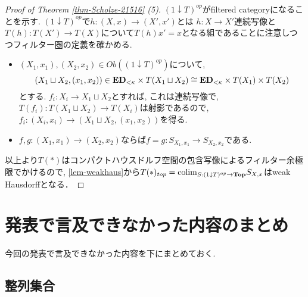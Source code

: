 \documentclass[dvipdfmx,a4paper,11pt]{report}
\newcommand{\colim}{{\rm colim}}
\theoremstyle{definition}
\begin{document}
\begin{proof}[Proof of Theorem \ref{thm-Scholze-21516} (5)]
 $ ( 1\downarrow T)^{op}$がfiltered categoryになることを示す. 
  $ ( 1\downarrow T)^{op}$で$h : (X,x) \to (X',x') $とは $h : X \to X'$連続写像と$T(h): T(X') \to T(X)$について$T(h)x' =x$となる組であることに注意しつつフィルター圏の定義を確かめる. 
 \begin{itemize}
\item $(X_1, x_1), (X_2,x_2) \in Ob(( 1\downarrow T)^{op})$について, 
$$(X_1 \sqcup X_2 , (x_1,x_2)) \in {\bf ED}_{<\kappa} \times T(X_1 \sqcup X_2) \cong {\bf ED}_{<\kappa} \times T(X_1) \times T(X_2)$$
とする.  
$f_i : X_i \to X_1 \sqcup X_2$とすれば, これは連続写像で, $T(f_i) : T(X_1 \sqcup X_2) \to T(X_i)$は射影であるので, $f_i : (X_i,x_i) \to (X_1 \sqcup X_2 , (x_1,x_2)) $を得る. 
\item $f, g : (X_1, x_1) \to (X_2,x_2) $ならば$f=g : S_{X_1, x_1} \to S_{X_2, x_2}$である.
\end{itemize}

以上より$T(\ast)$はコンパクトハウスドルフ空間の包含写像によるフィルター余極限でかけるので, \ref{lem-weakhaus}から$T(\ast)_{top} = \colim_{S : ( 1\downarrow T)^{op} \to {\bf Top}}S_{X,x}$はweak Hausdorffとなる．

\end{proof}





\newpage


\renewcommand{\thesection}{\Alph{section}} \setcounter{section}{0}
\section{発表で言及できなかった内容のまとめ}
今回の発表で言及できなかった内容を下にまとめておく.


\subsection{整列集合}
\end{document}
